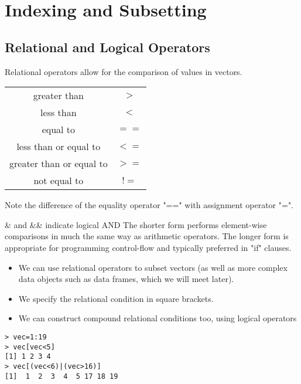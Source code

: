\documentclass[a4paper,12pt]{article}
\begin{document}



\section{Indexing and Subsetting }
\subsection{Relational and Logical Operators}

Relational operators allow for the comparison of values in vectors.
\begin{center}
\begin{tabular}{|c|c|}
  \hline
greater than &	$>$\\
less than&	$<$\\
equal to	&$==$\\
less than or equal to&	$<=$\\
greater than or equal to&	$>=$\\
not equal to	&$!=$\\
  \hline
\end{tabular}
\end{center}


Note the difference of the equality operator "==" with assignment operator "=".

\& and \&\& indicate logical AND %
The shorter form performs element-wise comparisons in much the same way as arithmetic operators. The longer form is appropriate for programming control-flow and typically preferred in "if" clauses.
\begin{itemize}
\item We can use relational operators to subset vectors (as well as more complex data objects such as data frames, which we will meet later).
\item We specify the  relational condition in square brackets.
\item We can construct compound relational conditions too, using logical operators
\end{itemize}
\begin{framed}
\begin{verbatim}
> vec=1:19
> vec[vec<5]
[1] 1 2 3 4
> vec[(vec<6)|(vec>16)]
[1]  1  2  3  4  5 17 18 19
\end{verbatim}
\end{framed}
\end{document}
